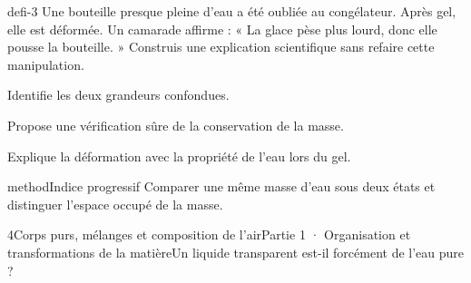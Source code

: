 \documentclass[12pt,twoside,openany]{book}
\begin{document}
\label{defi-ex-3}
\begin{pcFiche}{defi-3}
Une bouteille presque pleine d’eau a été oubliée au congélateur. Après gel, elle est déformée. Un camarade affirme : « La glace pèse plus lourd, donc elle pousse la bouteille. » Construis une explication scientifique sans refaire cette manipulation.\par
{}
\begin{questions}
\item Identifie les deux grandeurs confondues.
\item Propose une vérification sûre de la conservation de la masse.
\item Explique la déformation avec la propriété de l’eau lors du gel.
\end{questions}
\begin{pcEncadre}{method}{Indice progressif}
Comparer une même masse d’eau sous deux états et distinguer l’espace occupé de la masse.\par
\end{pcEncadre}
\end{pcFiche}
\clearpage\pagestyle{otMain}
\begin{ouverture}[college1]{4}{Corps purs, mélanges et composition de l’air}{Partie 1 · Organisation et transformations de la matière}{Un liquide transparent est-il forcément de l’eau pure ?}
\end{ouverture}
\label{ch-4-cours-1}
\label{ess-4}
\end{document}
